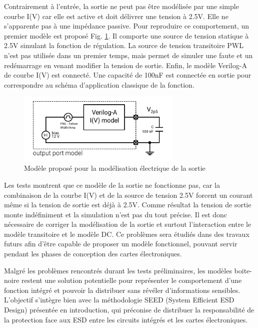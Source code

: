 Contrairement à l'entrée, la sortie ne peut pas être modélisée par une simple courbe I(V) car elle est active et doit délivrer une tension à 2.5V.
Elle ne s'apparente pas à une impédance passive.
Pour reproduire ce comportement, un premier modèle est proposé Fig. \ref{fig:first-output-model}.
Il comporte une source de tension statique à 2.5V simulant la fonction de régulation.
La source de tension transitoire PWL n'est pas utilisée dans un premier temps, mais permet de simuler une faute et un redémarrage en venant modifier la tension de sortie.
Enfin, le modèle Verilog-A de courbe I(V) est connecté.
Une capacité de 100nF est connectée en sortie pour correspondre au schéma d'application classique de la fonction.

\begin{figure}[!h]
  \centering
  \includegraphics[width=0.7\textwidth]{src/1/figures/first_output_model.pdf}
  \caption{Modèle proposé pour la modélisation électrique de la sortie}
  \label{fig:first-output-model}
\end{figure}

Les tests montrent que ce modèle de la sortie ne fonctionne pas, car la combinaison de la courbe I(V) et de la source de tension 2.5V forcent un courant même si la tension de sortie est déjà à 2.5V.
Comme résultat la tension de sortie monte indéfiniment et la simulation n'est pas du tout précise.
Il est donc nécessaire de corriger la modélisation de la sortie et surtout l’interaction entre le modèle transitoire et le modèle DC.
Ce problèmes sera étudiés dans des travaux futurs afin d'être capable de proposer un modèle fonctionnel, pouvant servir pendant les phases de conception des cartes électroniques.

Malgré les problèmes rencontrés durant les tests préliminaires, les modèles boite-noire restent une solution potentielle pour représenter le comportement d'une fonction intégré et pouvoir la distribuer sans révéler d'informations sensibles.
L'objectif s'intègre bien avec la méthodologie SEED (System Efficient ESD Design) \cite{seed} présentée en introduction, qui préconise de distribuer la responsabilité de la protection face aux ESD entre les circuits intégrés et les cartes électroniques.

